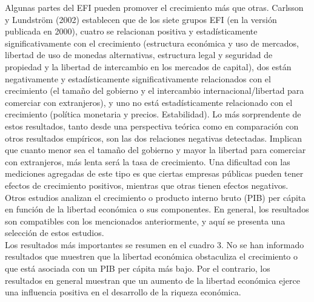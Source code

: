     Algunas partes del EFI pueden promover el crecimiento más que otras. Carlsson y Lundström (2002) establecen que de los siete grupos EFI (en la versión publicada en 2000), cuatro se relacionan positiva y estadísticamente significativamente con el crecimiento (estructura económica y uso de mercados, libertad de uso de monedas alternativas, estructura legal y seguridad de propiedad y la libertad de intercambio en los mercados de capital), dos están negativamente y estadísticamente significativamente relacionados con el crecimiento (el tamaño del gobierno y el intercambio internacional/libertad para comerciar con extranjeros), y uno no está estadísticamente relacionado con el crecimiento (política monetaria y precios. Estabilidad). Lo más sorprendente de estos resultados, tanto desde una perspectiva teórica como en comparación con otros resultados empíricos, son las dos relaciones negativas detectadas. Implican que cuanto menor sea el tamaño del gobierno y mayor la libertad para comerciar con extranjeros, más lenta será la tasa de crecimiento. Una dificultad con las mediciones agregadas de este tipo es que ciertas empresas públicas pueden tener efectos de crecimiento positivos, mientras que otras tienen efectos negativos. 
    Otros estudios analizan el crecimiento o producto interno bruto (PIB) per cápita en función de la libertad económica o sus componentes. En general, los resultados son compatibles con los mencionados anteriormente, y aquí se presenta una selección de estos estudios.\\

    Los resultados más importantes se resumen en el cuadro 3. No se han informado resultados que muestren que la libertad económica obstaculiza el crecimiento o que está asociada con un PIB per cápita más bajo. Por el contrario, los resultados en general muestran que un aumento de la libertad económica ejerce una influencia positiva en el desarrollo de la riqueza económica.\\

